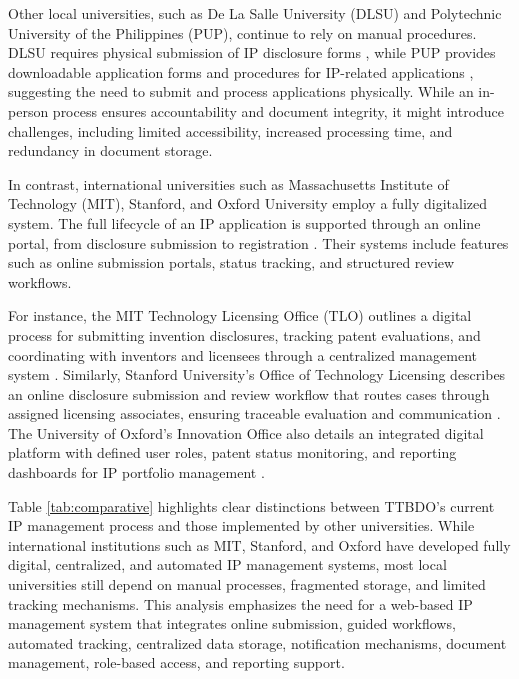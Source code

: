 Other local universities, such as De La Salle University (DLSU) and Polytechnic University of the Philippines (PUP), continue to rely on manual procedures. DLSU requires physical submission of IP disclosure forms \citep{DLSUIPPolicy}, while PUP provides downloadable application forms and procedures for IP-related applications \citep{PUPCopyrightProcedure}, suggesting the need to submit and process applications physically. While an in-person process ensures accountability and document integrity, it might introduce challenges, including limited accessibility, increased processing time, and redundancy in document storage.

In contrast, international universities such as Massachusetts Institute of Technology (MIT), Stanford, and Oxford University employ a fully digitalized system. The full lifecycle of an IP application is supported through an online portal, from disclosure submission to registration \citep{mittlo2021-inventors-guide,mittlo2020-patenting,stanfordOTL2021-process,oxfordinnovation2013-booklet}. Their systems include features such as online submission portals, status tracking, and structured review workflows. 

For instance, the MIT Technology Licensing Office (TLO) outlines a digital process for submitting invention disclosures, tracking patent evaluations, and coordinating with inventors and licensees through a centralized management system \citep{mittlo2021-inventors-guide,mittlo2020-patenting}. Similarly, Stanford University’s Office of Technology Licensing describes an online disclosure submission and review workflow that routes cases through assigned licensing associates, ensuring traceable evaluation and communication \citep{stanfordOTL2021-process}. The University of Oxford’s Innovation Office also details an integrated digital platform with defined user roles, patent status monitoring, and reporting dashboards for IP portfolio management \citep[p.~11]{oxfordinnovation2013-booklet}.

Table \ref{tab:comparative} highlights clear distinctions between TTBDO’s current IP management process and those implemented by other universities. While international institutions such as MIT, Stanford, and Oxford have developed fully digital, centralized, and automated IP management systems, most local universities still depend on manual processes, fragmented storage, and limited tracking mechanisms. This analysis emphasizes the need for a web-based IP management system that integrates online submission, guided workflows, automated tracking, centralized data storage, notification mechanisms, document management, role-based access, and reporting support.

